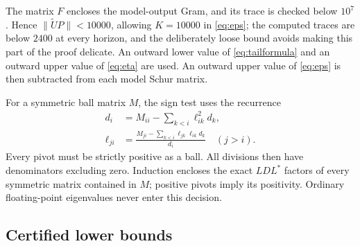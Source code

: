 \documentclass[11pt]{article}
\numberwithin{equation}{section}
\theoremstyle{definition}
\theoremstyle{remark}
\newcommand{\norm}[1]{\lVert#1\rVert}
\begin{document}
The matrix $F$ encloses the model-output Gram, and its trace is checked
below $10^7$. Hence $\norm{\widetilde UP}<10000$, allowing $K=10000$
in \eqref{eq:eps}; the computed traces are below $2400$ at every horizon, and
the deliberately loose bound avoids making this part of the proof delicate.
An outward lower value of \eqref{eq:tailformula} and an outward upper value
of \eqref{eq:eta} are used. An outward upper value of \eqref{eq:eps} is
then subtracted from each model Schur matrix.

For a symmetric ball matrix $M$, the sign test uses the recurrence
\begin{align*}
 d_i&=M_{ii}-\sum_{k<i}\ell_{ik}^2d_k,\\
 \ell_{ji}&=\frac{M_{ji}-\sum_{k<i}\ell_{jk}\ell_{ik}d_k}{d_i}\quad(j>i).
\end{align*}
Every pivot must be strictly positive as a ball. All divisions then have
denominators excluding zero. Induction encloses the exact $LDL^*$ factors
of every symmetric matrix contained in $M$; positive pivots imply its
positivity. Ordinary floating-point eigenvalues never enter this decision.

\subsection{Certified lower bounds}
\end{document}

